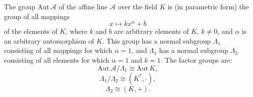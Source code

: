 The group $\text{Aut}\,\mathcal{A}$ of the affine line $\mathcal{A}$ over the field $K$ is (in parametric form) the group of all mappings
$$x \mapsto k x^{\alpha} + b$$
of the elements of $K$, where $k$ and $b$ are arbitrary elements of $K$, $k \neq 0$, and $\alpha$ is an arbitrary automorphism of $K$. This group has a normal subgroup $\Lambda_1$ consisting of all mappings for which $\alpha = 1$, and $\Lambda_1$ has a normal subgroup $\Lambda_2$ consisting of all elements for which $\alpha = 1$ and $k = 1$. The factor groups are:
$$\text{Aut}\,\mathcal{A} / \Lambda_1 \cong \text{Aut}\,K,$$
$$\Lambda_1 / \Lambda_2 \cong (K^*, \cdot),$$
$$\Lambda_2 \cong (K, +).$$
